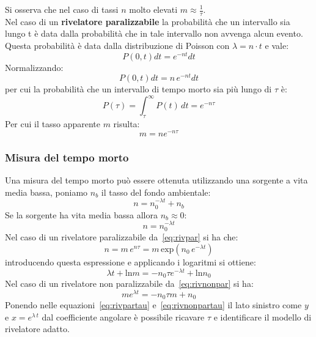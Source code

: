 Si osserva che nel caso di tassi $n$ molto elevati $m \approx \frac{1}{\tau}$.\\
Nel caso di un \textbf{rivelatore paralizzabile} la probabilit\`a che un intervallo sia lungo t \`e data dalla probabilit\`a che
in tale intervallo non avvenga alcun evento. 
Questa probabilit\`a \`e data dalla distribuzione di Poisson con $\lambda = n \cdot t$ e vale:
\begin{equation*}
P(0,t) dt = e^{-nt} dt
\end{equation*}
Normalizzando:
\begin{equation*}
P(0,t) dt  = n\,e^{-nt} dt
\end{equation*}
per cui la probabilit\`a che un intervallo di tempo morto sia pi\`u lungo di $\tau$ \`e:
\begin{equation*}
P(\tau) = \int_{\tau}^{\infty} P(t) \, dt = e^{-n \tau}
\end{equation*}
Per cui il tasso apparente $m$ risulta:
\begin{equation} \label{eq:rivpar}
m=n e^{-n\tau}
 \end{equation}
\subsubsection{Misura del tempo morto}
Una misura del tempo morto pu\`o essere ottenuta utilizzando una sorgente a vita media bassa, poniamo $n_b$ il tasso del fondo ambientale:
\begin{equation*}
n = n_0^{-\lambda t} + n_b
\end{equation*}
Se la sorgente ha vita media bassa allora $n_b \approx 0$:
\begin{equation*}
n = n_0^{-\lambda t}
\end{equation*}
Nel caso di un rivelatore paralizzabile da~\ref{eq:rivpar} si ha che:
\begin{equation*}
n = m \, e^{n\tau } = m \, \text{exp}(n_0 \, e^{-\lambda t})
\end{equation*}
introducendo questa espressione e applicando i logaritmi si ottiene:
\begin{equation} \label{eq:rivpartau}
\lambda t + \text{ln} m = - n_0 \tau e^{-\lambda t} + \text{ln} n_0
\end{equation}
Nel caso di un rivelatore non paralizzabile da~\ref{eq:rivnonpar} si ha:
\begin{equation} \label{eq:rivnonpartau}
m e^{\lambda t} = -n_0 \tau m + n_0
\end{equation}
Ponendo nelle equazioni~\ref{eq:rivpartau} e~\ref{eq:rivnonpartau} il lato sinistro come $y$ e $x = e^{\lambda \, t}$ 
dal coefficiente angolare \`e possibile ricavare $\tau$ e identificare il modello di rivelatore adatto.